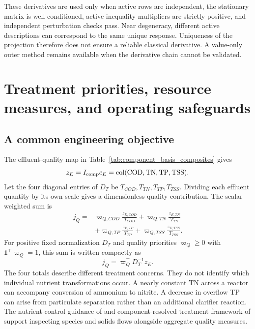 These derivatives are used only when active rows are independent, the stationary matrix is well conditioned, active inequality multipliers are strictly positive, and independent perturbation checks pass. Near degeneracy, different active descriptions can correspond to the same unique response. Uniqueness of the projection therefore does not ensure a reliable classical derivative. A value-only outer method remains available when the derivative chain cannot be validated.

\section{Treatment priorities, resource measures, and operating safeguards}

\subsection{A common engineering objective}

The effluent-quality map in Table~\ref{tab:component_basis_composites} gives
\begin{equation}
z_E=I_{\rm comp}c_E=\operatorname{col}(\mathrm{COD},\mathrm{TN},\mathrm{TP},\mathrm{TSS}).
\end{equation}
Let the four diagonal entries of $D_T$ be $T_{COD},T_{TN},T_{TP},T_{TSS}$. Dividing each effluent quantity by its own scale gives a dimensionless quality contribution. The scalar weighted sum is
\begin{equation}
\begin{aligned}
j_Q={}&\varpi_{Q,COD}\frac{z_{E,COD}}{T_{COD}}
+\varpi_{Q,TN}\frac{z_{E,TN}}{T_{TN}}\\
&+\varpi_{Q,TP}\frac{z_{E,TP}}{T_{TP}}
+\varpi_{Q,TSS}\frac{z_{E,TSS}}{T_{TSS}}.
\end{aligned}
\end{equation}
For positive fixed normalization $D_T$ and quality priorities $\varpi_Q\ge0$ with $\mathbf1^\top\varpi_Q=1$, this sum is written compactly as
\begin{equation}
j_Q=\varpi_Q^\top D_T^{-1}z_E.
\label{eq:plant_quality_objective}
\end{equation}
The four totals describe different treatment concerns. They do not identify which individual nutrient transformations occur. A nearly constant TN across a reactor can accompany conversion of ammonium to nitrite. A decrease in overflow TP can arise from particulate separation rather than an additional clarifier reaction. The nutrient-control guidance of \citet{USEPA2009} and component-resolved treatment framework of \citet{Zhang2026} support inspecting species and solids flows alongside aggregate quality measures.

